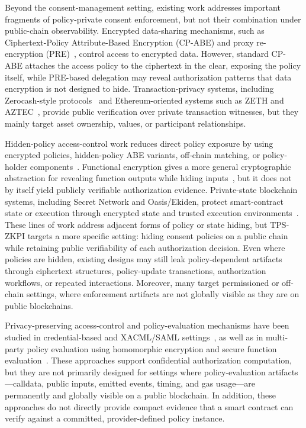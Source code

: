 Beyond the consent-management setting, existing work addresses important fragments of policy-private consent enforcement, but not their combination under public-chain observability.
Encrypted data-sharing mechanisms, such as Ciphertext-Policy Attribute-Based Encryption (CP-ABE) and proxy re-encryption (PRE)~\cite{bethencourt2007ciphertext,ateniese2006improved}, control access to encrypted data. However, standard CP-ABE attaches the access policy to the ciphertext in the clear, exposing the policy itself, while PRE-based delegation may reveal authorization patterns that data encryption is not designed to hide.
Transaction-privacy systems, including Zerocash-style protocols~\cite{sasson2014zerocash} and Ethereum-oriented systems such as ZETH and AZTEC~\cite{rondelet2019zeth,williamson2018aztec}, provide public verification over private transaction witnesses, but they mainly target asset ownership, values, or participant relationships.

Hidden-policy access-control work reduces direct policy exposure by using encrypted policies, hidden-policy ABE variants, off-chain matching, or policy-holder components~\cite{wu2023blockchain,hu2023access}.
Functional encryption gives a more general cryptographic abstraction for revealing function
outputs while hiding inputs~\cite{boneh2011functional}, but it does not by itself yield publicly verifiable authorization evidence.
Private-state blockchain systems, including Secret Network and Oasis/Ekiden, protect smart-contract state or execution through encrypted state and trusted execution environments~\cite{secretnetwork_docs, cheng2019ekiden}.
These lines of work address adjacent forms of policy or state hiding, but TPS-ZKPI
targets a more specific setting: hiding consent policies on a public chain while
retaining public verifiability of each authorization decision.
Even where policies are hidden, existing designs may still leak policy-dependent artifacts through ciphertext structures, policy-update transactions, authorization workflows, or repeated interactions.
Moreover, many target permissioned or off-chain settings, where enforcement artifacts are not globally visible as they are on public blockchains.

Privacy-preserving access-control and policy-evaluation mechanisms have been studied in credential-based and XACML/SAML settings~\cite{ardagna2009xacml}, as well as in multi-party policy evaluation using homomorphic encryption and secure function evaluation~\cite{sheikhalishahi2019privacy}.
These approaches support confidential authorization computation, but they are not primarily designed for settings where policy-evaluation artifacts---calldata, public inputs, emitted events, timing, and gas usage---are permanently and globally visible on a public blockchain.
In addition, these approaches do not directly provide compact evidence that a smart contract can verify against a committed, provider-defined policy instance.


